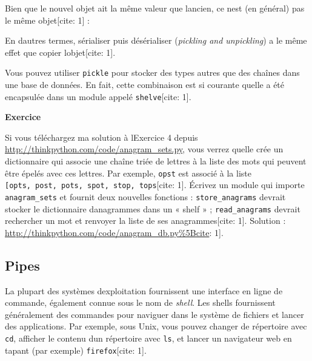 Bien que le nouvel objet ait la même valeur que
l\textquotesingle ancien, ce n\textquotesingle est (en général) pas le
même objet{[}cite: 1{]} :

\begin{Shaded}
\begin{Highlighting}[]
\OperatorTok{\textgreater{}\textgreater{}\textgreater{}}\OperatorTok{==}
\OperatorTok{\textgreater{}\textgreater{}\textgreater{}}
\end{Highlighting}
\end{Shaded}

En d\textquotesingle autres termes, sérialiser puis désérialiser
(\emph{pickling and unpickling}) a le même effet que copier
l\textquotesingle objet{[}cite: 1{]}.

Vous pouvez utiliser \texttt{pickle} pour stocker des types autres que
des chaînes dans une base de données. En fait, cette combinaison est si
courante qu\textquotesingle elle a été encapsulée dans un module appelé
\texttt{shelve}{[}cite: 1{]}.

\textbf{Exercice}

Si vous téléchargez ma solution à l\textquotesingle Exercice 4 depuis
\url{http://thinkpython.com/code/anagram_sets.py}, vous verrez
qu\textquotesingle elle crée un dictionnaire qui associe une chaîne
triée de lettres à la liste des mots qui peuvent être épelés avec ces
lettres. Par exemple, \texttt{\textquotesingle{}opst\textquotesingle{}}
est associé à la liste
\texttt{{[}\textquotesingle{}opts\textquotesingle{},\ \textquotesingle{}post\textquotesingle{},\ \textquotesingle{}pots\textquotesingle{},\ \textquotesingle{}spot\textquotesingle{},\ \textquotesingle{}stop\textquotesingle{},\ \textquotesingle{}tops\textquotesingle{}{]}}{[}cite:
1{]}. Écrivez un module qui importe \texttt{anagram\_sets} et fournit
deux nouvelles fonctions : \texttt{store\_anagrams} devrait stocker le
dictionnaire d\textquotesingle anagrammes dans un « shelf » ;
\texttt{read\_anagrams} devrait rechercher un mot et renvoyer la liste
de ses anagrammes{[}cite: 1{]}. Solution :
\url{http://thinkpython.com/code/anagram_db.py\%5Bcite}: 1{]}.

\hypertarget{pipes}{%
\subsection{Pipes}\label{pipes}}

La plupart des systèmes d\textquotesingle exploitation fournissent une
interface en ligne de commande, également connue sous le nom de
\emph{shell}. Les shells fournissent généralement des commandes pour
naviguer dans le système de fichiers et lancer des applications. Par
exemple, sous Unix, vous pouvez changer de répertoire avec \texttt{cd},
afficher le contenu d\textquotesingle un répertoire avec \texttt{ls}, et
lancer un navigateur web en tapant (par exemple)
\texttt{firefox}{[}cite: 1{]}.

